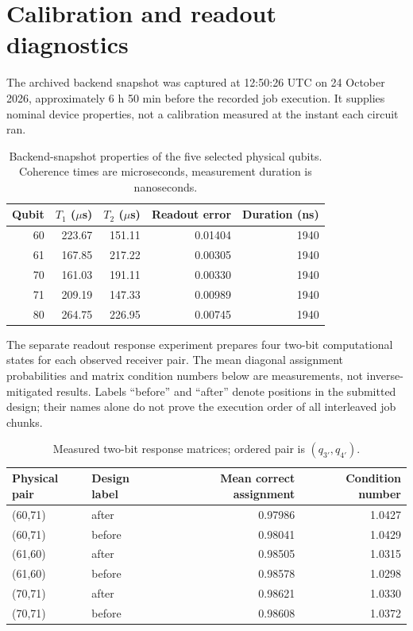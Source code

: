 \documentclass[10pt,a4paper]{article}
\begin{document}
\section{Calibration and readout diagnostics}
The archived backend snapshot was captured at 12:50:26 UTC on 24 October 2026, approximately 6 h 50 min before the recorded job execution. It supplies nominal device properties, not a calibration measured at the instant each circuit ran.
\par\begin{table}[htbp]\centering\small
\caption{Backend-snapshot properties of the five selected physical qubits. Coherence times are microseconds, measurement duration is nanoseconds.}\label{stab:calib}
\begin{tabular}{rrrrr}\toprule
Qubit & $T_1$ ($\mu$s) & $T_2$ ($\mu$s) & Readout error & Duration (ns)\\\midrule
60 & 223.67 & 151.11 & 0.01404 & 1940 \\
61 & 167.85 & 217.22 & 0.00305 & 1940 \\
70 & 161.03 & 191.11 & 0.00330 & 1940 \\
71 & 209.19 & 147.33 & 0.00989 & 1940 \\
80 & 264.75 & 226.95 & 0.00745 & 1940 \\
\bottomrule\end{tabular}\end{table}\par
\clearpage
The separate readout response experiment prepares four two-bit computational states for each observed receiver pair. The mean diagonal assignment probabilities and matrix condition numbers below are measurements, not inverse-mitigated results. Labels ``before'' and ``after'' denote positions in the submitted design; their names alone do not prove the execution order of all interleaved job chunks.
\par\begin{table}[htbp]\centering\small
\caption{Measured two-bit response matrices; ordered pair is $(q_{3'},q_{4'})$.}\label{stab:readout}
\begin{tabular}{llrr}\toprule
Physical pair & Design label & Mean correct assignment & Condition number\\\midrule
(60,71) & after & 0.97986 & 1.0427 \\
(60,71) & before & 0.98041 & 1.0429 \\
(61,60) & after & 0.98505 & 1.0315 \\
(61,60) & before & 0.98578 & 1.0298 \\
(70,71) & after & 0.98621 & 1.0330 \\
(70,71) & before & 0.98608 & 1.0372 \\
\bottomrule\end{tabular}\end{table}\par
\end{document}
